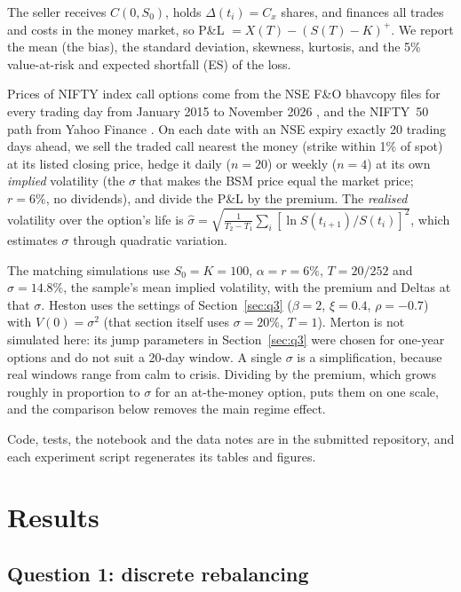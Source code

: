 \documentclass[11pt,a4paper]{article}
\begin{document}
The seller receives $C(0,S_0)$, holds $\Delta(t_i)=C_x$ shares, and finances all trades and costs in the money market, so P\&L $=X(T)-(S(T)-K)^+$. We report the mean (the bias), the standard deviation, skewness, kurtosis, and the 5\% value-at-risk and expected shortfall (ES) of the loss.

Prices of NIFTY index call options come from the NSE F\&O bhavcopy files for every trading day from January 2015 to November 2026 \cite{nse}, and the NIFTY~50 path from Yahoo Finance \cite{yahoo}. On each date with an NSE expiry exactly 20 trading days ahead, we sell the traded call nearest the money (strike within 1\% of spot) at its listed closing price, hedge it daily ($n=20$) or weekly ($n=4$) at its own \emph{implied} volatility (the $\sigma$ that makes the BSM price equal the market price; $r=6\%$, no dividends), and divide the P\&L by the premium. The \emph{realised} volatility over the option's life is $\hat\sigma=\sqrt{\frac{1}{T_2-T_1}\sum_i[\ln S(t_{i+1})/S(t_i)]^2}$, which estimates $\sigma$ through quadratic variation.

The matching simulations use $S_0=K=100$, $\alpha=r=6\%$, $T=20/252$ and $\sigma=14.8\%$, the sample's mean implied volatility, with the premium and Deltas at that $\sigma$. Heston uses the settings of Section~\ref{sec:q3} ($\beta=2$, $\xi=0.4$, $\rho=-0.7$) with $V(0)=\sigma^2$ (that section itself uses $\sigma=20\%$, $T=1$). Merton is not simulated here: its jump parameters in Section~\ref{sec:q3} were chosen for one-year options and do not suit a 20-day window. A single $\sigma$ is a simplification, because real windows range from calm to crisis. Dividing by the premium, which grows roughly in proportion to $\sigma$ for an at-the-money option, puts them on one scale, and the comparison below removes the main regime effect.

Code, tests, the notebook and the data notes are in the submitted repository, and each experiment script regenerates its tables and figures.

\section{Results}

\subsection{Question 1: discrete rebalancing}
\end{document}
